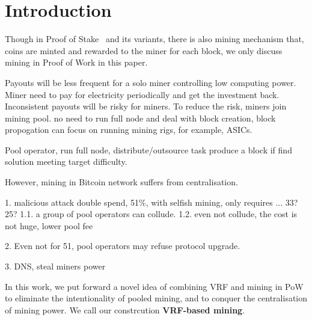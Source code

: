 \section{Introduction}


Though in Proof of Stake~\cite{} and its variants, there is also mining
mechanism that, coins are minted and rewarded to the miner for each block, we
only discuss mining in Proof of Work in this paper.


Payouts will be less frequent for a solo miner controlling low computing power.
Miner need to pay for electricity periodically and get the investment back.
Inconsistent payouts will be risky for miners.
To reduce the risk, miners join mining pool.
no need to run full node and deal with block creation, block propogation
can focus on running mining rigs, for example, ASICs.

Pool operator, run full node, distribute/outsource task
produce a block if find solution meeting target difficulty.

However, mining in Bitcoin network suffers from centralisation.




1. malicious attack
double spend, 51\%, with selfish mining, only requires ... 33?25?
1.1. a group of pool operators can collude.
1.2. even not collude, the cost is not huge, lower pool fee

2. Even not for 51, 
pool operators may refuse protocol upgrade. 


3. DNS, steal miners power


In this work, we put forward a novel idea of combining VRF and mining in PoW
to eliminate the intentionality of pooled mining, and to conquer the
centralisation of mining power. We call our constrcution \textbf{VRF-based
mining}.